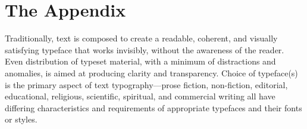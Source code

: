 \documentclass[twoside]{xarticle}
\begin{document}
\clearpage

\appendix

\section{The Appendix}
\thispagestyle{empty}

Traditionally, text is composed to create a readable, coherent, and visually
satisfying typeface that works invisibly, without the awareness of the reader.
Even distribution of typeset material, with a minimum of distractions and
anomalies, is aimed at producing clarity and transparency. Choice of typeface(s)
is the primary aspect of text typography—prose fiction, non-fiction, editorial,
educational, religious, scientific, spiritual, and commercial writing all have
differing characteristics and requirements of appropriate typefaces and their
fonts or styles.
\end{document}
